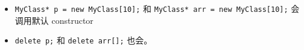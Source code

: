 
\begin{itemize}
\item \verb`MyClass* p = new MyClass[10];` 和 \verb`MyClass* arr = new MyClass[10];` 会调用默认 constructor
\item \verb`delete p;` 和 \verb`delete arr[];` 也会。
\end{itemize}
